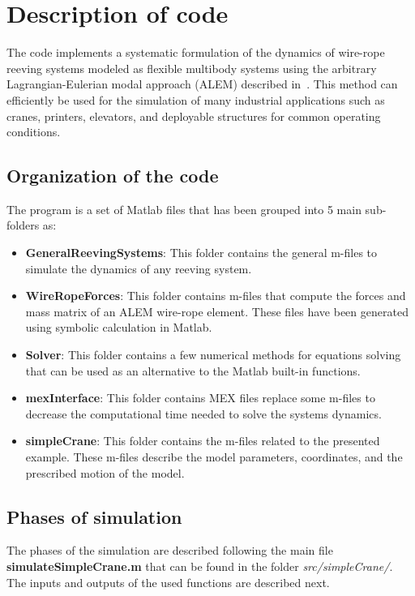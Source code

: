 \section{Description of code}

The code implements a systematic formulation of the dynamics of wire-rope reeving systems modeled as flexible multibody systems using the arbitrary Lagrangian-Eulerian modal approach (ALEM) described in~\cite{Escalona2022}. This method can efficiently be used for the simulation of many industrial applications such as cranes, printers, elevators, and deployable structures for common operating conditions.

\subsection{Organization of the code}

The program is a set of Matlab files that has been grouped into 5 main sub-folders as:
\begin{itemize}
\item{\textbf{GeneralReevingSystems}: This folder contains the general m-files to simulate the dynamics of any reeving system.}
\item{\textbf{WireRopeForces}: This folder contains m-files that compute the forces and mass matrix of an ALEM  wire-rope element. These files have been generated using symbolic calculation in Matlab.}
\item{\textbf{Solver}: This folder contains a few numerical methods for equations solving that can be used as an alternative to the Matlab built-in functions.}
\item{\textbf{mexInterface}: This folder contains MEX files replace some m-files to decrease the computational time needed to solve the systems dynamics.}
\item{\textbf{simpleCrane}: This folder contains the m-files related to the presented example. These m-files describe the model parameters, coordinates, and the prescribed motion of the model. }
\end{itemize}

\subsection{Phases of simulation}

The phases of the simulation are described following the main file \textbf{simulateSimpleCrane.m} that can be found in the folder \textit{src/simpleCrane/}. The inputs and outputs of the used functions are described next. \\

